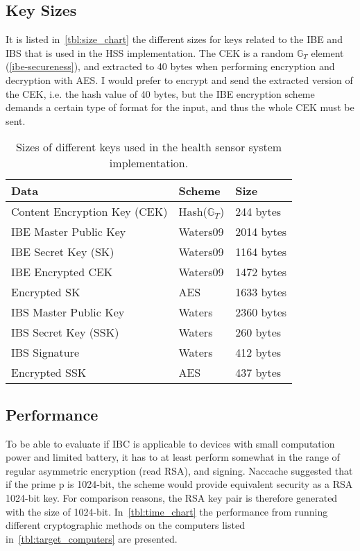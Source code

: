\subsection{Key Sizes}
It is listed in~\autoref{tbl:size_chart} the different sizes for keys related to the \gls{IBE} and \gls{IBS} that is used in the \gls{HSS} implementation.
The \gls{CEK} is a random $\mathbb{G}_T$ element (\autoref{ibe-secureness}), and extracted to 40 bytes when performing encryption and decryption with \gls{AES}.
I would prefer to encrypt and send the extracted version of the \gls{CEK}, i.e. the hash value of 40 bytes, but the \gls{IBE} encryption scheme demands a certain type of format for the input, and thus the whole \gls{CEK} must be sent.
\begin{table}[h]
  \begin{tabular}[c]{p{}p{}p{}}
  Data                            & Scheme          & Size              \\ \hline
  Content Encryption Key (CEK)    & Hash($\mathbb{G}_T$) & 244 bytes         \\ %
  IBE Master Public Key           & Waters09        & 2014 bytes        \\ %
  IBE Secret Key (SK)             & Waters09        & 1164 bytes        \\ %
  IBE Encrypted CEK               & Waters09        & 1472 bytes        \\ %
  Encrypted SK                    & AES             & 1633 bytes        \\ %
  IBS Master Public Key           & Waters          & 2360 bytes        \\ %
  IBS Secret Key (SSK)            & Waters          & 260 bytes         \\ %
  IBS Signature                   & Waters          & 412 bytes         \\ %
  Encrypted SSK                   & AES             & 437 bytes         \\ %
  \end{tabular}
  \caption[Size chart of IBC parameters]{Sizes of different keys used in the health sensor system implementation.}
  \label{tbl:size_chart}
\end{table}


\subsection{Performance}\label{ibc-performance}
To be able to evaluate if \gls{IBC} is applicable to devices with small computation power and limited battery, it has to at least perform somewhat in the range of regular asymmetric encryption (read RSA), and signing. 
Naccache suggested that if the prime \gls{p} is 1024-bit, the scheme would provide equivalent security as a RSA 1024-bit key.
For comparison reasons, the RSA key pair is therefore generated with the size of 1024-bit.
In~\autoref{tbl:time_chart} the performance from running different cryptographic methods on the computers listed in~\autoref{tbl:target_computers} are presented.

